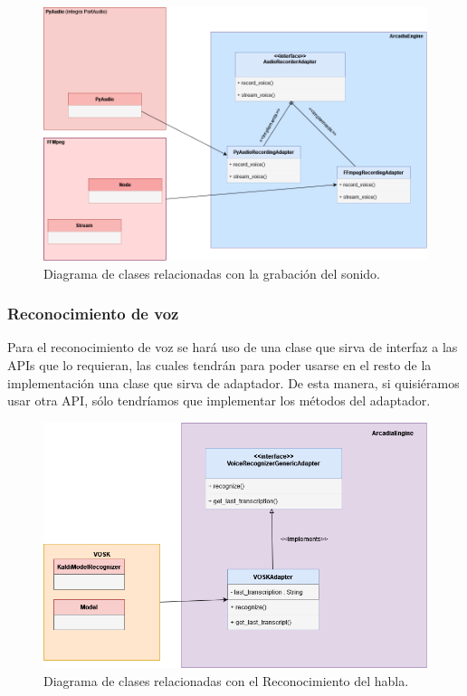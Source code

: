 \begin{figure}[H]
	\includegraphics[width=\textwidth]{imagenes/DiagramaClases_Grabacion.png}
	\caption{Diagrama de clases relacionadas con la grabación del sonido.}
\end{figure}

\subsubsection{Reconocimiento de voz}
Para el reconocimiento de voz se hará uso de una clase que sirva de interfaz a las APIs que lo requieran, las cuales tendrán para poder usarse en el resto de la implementación una clase que sirva de adaptador. De esta manera, si quisiéramos usar otra API, sólo tendríamos que implementar los métodos del adaptador.
\begin{figure}[H]
	\includegraphics[width=\textwidth]{imagenes/DiagramaClases_SR.png}
	\caption{Diagrama de clases relacionadas con el Reconocimiento del habla.}
\end{figure}
